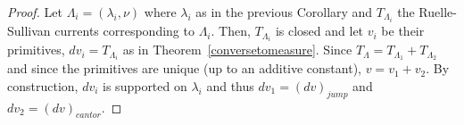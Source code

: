 \documentclass{ip-journal}
\theoremstyle{definition}
\numberwithin{equation}{section}
\begin{document}
\begin{proof}
% 
% 
Let  $\Lambda_i=(\lambda_i, \nu)$ where $\lambda_i$ as in the previous Corollary and $T_{\Lambda_i}$  the  Ruelle-Sullivan currents corresponding to $\Lambda_i$.  Then,
 $T_{\Lambda_i}$ is closed and let $v_i$ be their primitives, $dv_i=T_{\Lambda_i}$ as in Theorem~\ref{conversetomeasure}. Since
 $T_{\Lambda}=T_{\Lambda_1}+T_{\Lambda_2}$ and since the primitives are unique (up to an additive constant),
 $v=v_1+v_2$. By construction, $dv_i$ is supported on $\lambda_i$ and thus $dv_1=(dv)_{jump}$ and $dv_2=(dv)_{cantor}$.
% 
%  
 \end{proof}
% 
\end{document}
